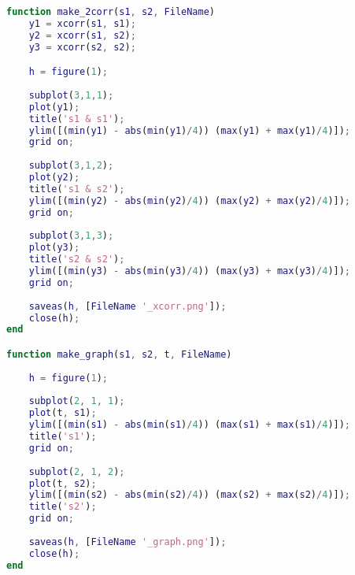 \documentclass[11pt, a4paper]{article}
\begin{document}
\begin{lstlisting}[language=matlab, frame=single]
function make_2corr(s1, s2, FileName)
    y1 = xcorr(s1, s1); 
    y2 = xcorr(s1, s2); 
    y3 = xcorr(s2, s2); 

    h = figure(1);
    
    subplot(3,1,1);
    plot(y1);
    title('s1 & s1');
    ylim([(min(y1) - abs(min(y1)/4)) (max(y1) + max(y1)/4)]);
    grid on;
    
    subplot(3,1,2);
    plot(y2);
    title('s1 & s2');
    ylim([(min(y2) - abs(min(y2)/4)) (max(y2) + max(y2)/4)]);
    grid on;
    
    subplot(3,1,3);
    plot(y3);
    title('s2 & s2');
    ylim([(min(y3) - abs(min(y3)/4)) (max(y3) + max(y3)/4)]);
    grid on;
    
    saveas(h, [FileName '_xcorr.png']);
    close(h);
end

function make_graph(s1, s2, t, FileName)
    
    h = figure(1);
    
    subplot(2, 1, 1);
    plot(t, s1);
    ylim([(min(s1) - abs(min(s1)/4)) (max(s1) + max(s1)/4)]);
    title('s1');
    grid on;
    
    subplot(2, 1, 2);
    plot(t, s2);
    ylim([(min(s2) - abs(min(s2)/4)) (max(s2) + max(s2)/4)]);
    title('s2');
    grid on;
    
    saveas(h, [FileName '_graph.png']);
    close(h);
end
\end{lstlisting}
\end{document}
